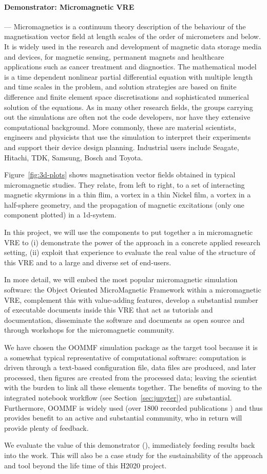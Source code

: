 \paragraph{Demonstrator: Micromagnetic VRE}
\label{sec:introduction-micromagnetic-vre-demonstrator}
--- Micromagnetics is a continuum theory description of the behaviour of
the magnetisation vector field at length scales of the order of
micrometers and below. It is widely used in the research and
development of magnetic data storage media and devices, for magnetic
sensing, permanent magnets and healthcare applications such as cancer
treatment and diagnostics. The mathematical model is a time dependent
nonlinear partial differential equation with multiple length and time
scales in the problem, and solution strategies are based on finite
difference and finite element space discretisations and sophisticated
numerical solution of the equations. As in many other research fields,
the groups carrying out the simulations are often not the code
developers, nor have they extensive computational background. More
commonly, these are material scientists, engineers and physicists that
use the simulation to interpret their experiments and support their
device design planning. Industrial users include Seagate, Hitachi,
TDK, Samsung, Bosch and Toyota.

Figure~\ref{fig:3d-plots} shows magnetisation vector fields obtained
in typical micromagnetic studies. They relate, from left to
right, to a set of interacting magnetic skyrmions in a thin flim, a
vortex in a thin Nickel film, a vortex in a half-sphere geometry, and
the propagation of magnetic excitations (only one component plotted)
in a 1d-system.

In this project, we will use the \TheProject components to put
together a in micromagnetic VRE to (i) demonstrate the power of the
approach in a concrete applied research setting, (ii) exploit that
experience to evaluate the real value of the structure of this VRE and
\TheProject to a large and diverse set of end-users.

In more detail, we will embed the most popular micromagnetic
simulation software: the Object Oriented MicroMagnetic Framework
\cite{OOMMF-url} within a micromagnetic VRE, complement this with
value-adding features, develop a substantial number of executable
documents inside this VRE that act as tutorials and documentation,
disseminate the software and documents as open source and through
workshops for the micromagnetic community.  

We have chosen the OOMMF simulation package as the target tool because
it is a somewhat typical representative of computational software:
computation is driven through a text-based configuration file, data
files are produced, and later processed, then figures are created from
the processed data; leaving the scientist with the burden to link all
these elements together. The benefits of moving to the integrated
notebook workflow (see Section~\ref{sec:jupyter}) are
substantial. Furthermore, OOMMF is widely used (over 1800 recorded
publications \cite{OOMMF-citations-url}) and thus provides benefit to
an active and substantial community, who in return will provide plenty
of feedback.

We evaluate the value of this demonstrator
(), immediately feeding
results back into the \TheProject work. This will also
be a case study for the sustainability of the approach and tool beyond
the life time of this H2020 project.

